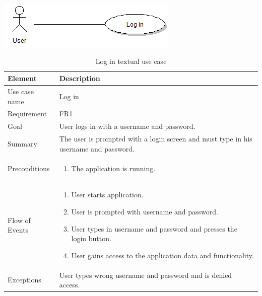 \begin{table}
\begin{center}
\begin{center}
\includegraphics[width=\textwidth]{login}
\end{center}
\begin{tabular}{p{3cm}|p{12cm}} \hline
\textbf{Element} & \textbf{Description} \\ \hline \hline
Use case name & Log in \\ 
Requirement & FR1 \\
Goal & User logs in with a username and password. \\
Summary &The user is prompted with a login screen and must type in his username and password. \\
Preconditions &
\begin{enumerate}
\item{}The application is running.
\end{enumerate} \\ \hline
Flow of Events &
\begin{enumerate}
\item{}User starts application.
\item{}User is prompted with username and password.
\item{}User types in username and password and presses the login button.
\item{}User gains access to the application data and functionality.
\end{enumerate} \\ \hline
Exceptions & User types wrong username and password and is denied access.\\ \hline
\end{tabular}
\end{center}
\caption{Log in textual use case} \label{tab:login}
\end{table}

